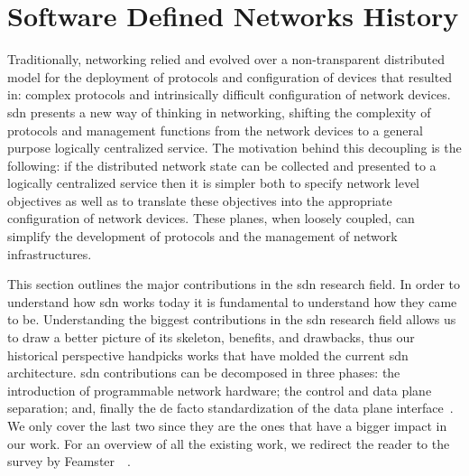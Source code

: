 \glsresetall

\section{Software Defined Networks History}
Traditionally, networking  relied and evolved over a non-transparent distributed model for the deployment of protocols and configuration of devices that resulted in: complex protocols and intrinsically difficult configuration of network devices. 
\gls{sdn} presents a new way of thinking in networking, shifting the complexity of protocols and management functions from  the  network devices to a general purpose logically centralized service. 
The motivation behind this decoupling is the following: if the distributed network state can be collected and presented to a logically centralized service then it is simpler  both to specify network level objectives as well as to translate these objectives into the appropriate configuration of network devices. 
These planes, when loosely coupled, can simplify the development of protocols and the management of network infrastructures. 

This section outlines the major contributions in the \gls{sdn} research field.   
In order to understand how \gls{sdn} works today it is fundamental to understand how they came to be. 
Understanding the biggest contributions in the \gls{sdn} research field allows us to draw a better picture of its skeleton, benefits, and drawbacks, thus our historical perspective handpicks works that have molded the current \gls{sdn} architecture. 
\gls{sdn} contributions can be decomposed  in three phases: the introduction of programmable network hardware; the control and data plane separation; and, finally the de facto standardization of the data plane interface~\cite{feamster2013road}. 
We only cover the last two since they are the ones that have a bigger impact in our work. 
For an overview of all the existing work, we redirect the reader to the survey by Feamster~\etal~\cite{feamster2013road}. 




